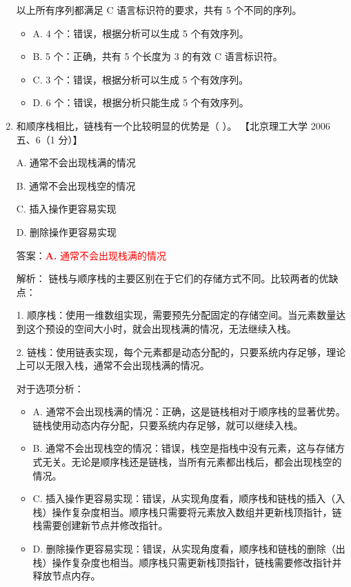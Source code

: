 \documentclass[lang=cn,newtx,10pt,scheme=chinese]{../../../elegantbook}
\begin{document}
\begin{enumerate}
    以上所有序列都满足 C 语言标识符的要求，共有 5 个不同的序列。

    \begin{itemize}
        \item A. 4 个：错误，根据分析可以生成 5 个有效序列。
        \item B. 5 个：正确，共有 5 个长度为 3 的有效 C 语言标识符。
        \item C. 3 个：错误，根据分析可以生成 5 个有效序列。
        \item D. 6 个：错误，根据分析只能生成 5 个有效序列。
    \end{itemize}

    \item 和顺序栈相比，链栈有一个比较明显的优势是（ ）。  
    【北京理工大学 2006 五、6（1 分）】

    A. 通常不会出现栈满的情况  

    B. 通常不会出现栈空的情况 

    C. 插入操作更容易实现  

    D. 删除操作更容易实现  

    答案：\textcolor{red}{\textbf{A.} 通常不会出现栈满的情况}

    解析：
    链栈与顺序栈的主要区别在于它们的存储方式不同。比较两者的优缺点：

    1. 顺序栈：使用一维数组实现，需要预先分配固定的存储空间。当元素数量达到这个预设的空间大小时，就会出现栈满的情况，无法继续入栈。

    2. 链栈：使用链表实现，每个元素都是动态分配的，只要系统内存足够，理论上可以无限入栈，通常不会出现栈满的情况。

    对于选项分析：
    \begin{itemize}
        \item A. 通常不会出现栈满的情况：正确，这是链栈相对于顺序栈的显著优势。链栈使用动态内存分配，只要系统内存足够，就可以继续入栈。
        \item B. 通常不会出现栈空的情况：错误，栈空是指栈中没有元素，这与存储方式无关。无论是顺序栈还是链栈，当所有元素都出栈后，都会出现栈空的情况。
        \item C. 插入操作更容易实现：错误，从实现角度看，顺序栈和链栈的插入（入栈）操作复杂度相当。顺序栈只需要将元素放入数组并更新栈顶指针，链栈需要创建新节点并修改指针。
        \item D. 删除操作更容易实现：错误，从实现角度看，顺序栈和链栈的删除（出栈）操作复杂度也相当。顺序栈只需更新栈顶指针，链栈需要修改指针并释放节点内存。
    \end{itemize}


\end{enumerate}
\end{document}
